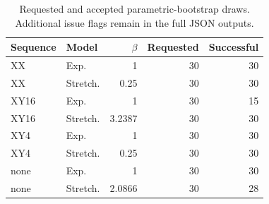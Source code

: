 \begin{table}[htbp]
\centering\small
\begin{tabular}{llrrr}
\toprule
Sequence & Model & $\beta$ & Requested & Successful \\
\midrule
XX & Exp. & 1 & 30 & 30 \\
XX & Stretch. & 0.25 & 30 & 30 \\
XY16 & Exp. & 1 & 30 & 15 \\
XY16 & Stretch. & 3.2387 & 30 & 30 \\
XY4 & Exp. & 1 & 30 & 30 \\
XY4 & Stretch. & 0.25 & 30 & 30 \\
none & Exp. & 1 & 30 & 30 \\
none & Stretch. & 2.0866 & 30 & 28 \\
\bottomrule\end{tabular}
\caption{Requested and accepted parametric-bootstrap draws. Additional issue flags remain in the full JSON outputs.}
\end{table}
